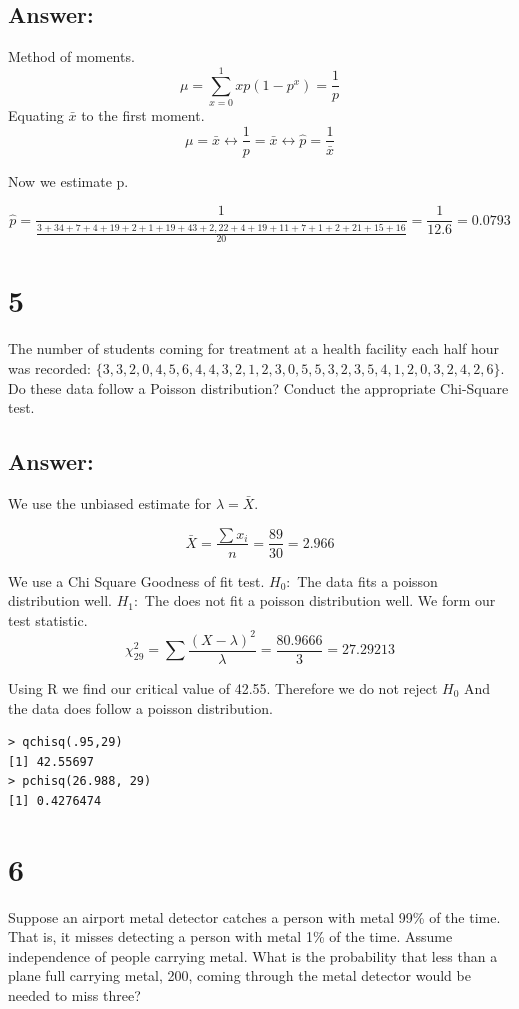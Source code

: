 \documentclass[svgnames]{article}
\begin{document}
\subsection*{Answer:}
Method of moments.
$$\mu= \sum_{x=0}^1x p(1-p^x) = \frac{1}{p}$$
Equating $\bar{x}$ to the first moment.
$$\mu=\bar{x} \leftrightarrow \frac{1}{p} = \bar{x} \leftrightarrow \hat{p}= \frac{1}{\bar{x}}$$

Now we estimate p.

$$\hat{p}=\frac{1}{\frac{3 + 34 + 7 + 4 +19 + 2 + 1 + 19+ 43+  2, 22+  4+ 19+ 11+ 7+  1+ 2+ 21+  15+  16}{20}} = \frac{1}{12.6}=0.0793$$

\section*{5}
The number of students coming for treatment at a health facility each half hour was recorded: $\{3, 3, 2, 0, 4, 5, 6, 4, 4, 3, 2, 1, 2, 3, 0, 5, 5, 3, 2, 3, 5, 4, 1, 2, 0, 3, 2, 4, 2, 6\}$. Do these data follow a Poisson distribution? Conduct the appropriate Chi-Square test.

\subsection*{Answer:}

We use the unbiased estimate for $\lambda = \bar{X}$.

$$\bar{X} = \frac{\sum x_i}{n} = \frac{89}{30} = 2.966$$


We use a Chi Square Goodness of fit test.
\newline
$H_0:$ The data fits a poisson distribution well.
\newline
$H_1:$ The does not fit a poisson distribution well.
We form our test statistic.
$$\chi^2_{29} = \sum { \frac{(X-\lambda)^2}{\lambda}} = \frac{80.9666}{3}=27.29213$$

Using R we find our critical value of 42.55.
Therefore we do not reject $H_0$ And the data does follow a poisson distribution. 
\begin{lstlisting}
> qchisq(.95,29)
[1] 42.55697
> pchisq(26.988, 29)
[1] 0.4276474
\end{lstlisting}

\section*{6}
Suppose an airport metal detector catches a person with metal 99\% of the time. That is, it misses detecting a person with metal 1\% of the time. Assume independence of people carrying metal. What is the probability that less than a plane full carrying metal, 200, coming through the metal detector would be needed to miss three?
\end{document}

